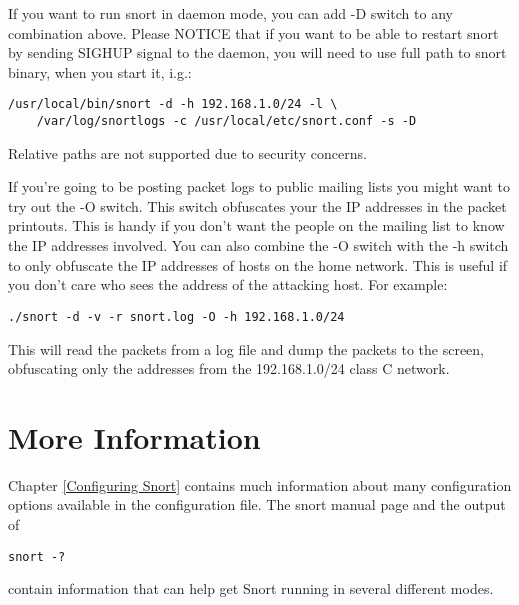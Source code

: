 \documentclass[english]{report}
\begin{document}
If you want to run snort in daemon mode, you can add -D switch to any
combination above. Please NOTICE that if you want to be able to restart snort
by sending SIGHUP signal to the daemon, you will need to use full path to snort
binary, when you start it, i.g.:

\begin{center}
\begin{verbatim}
/usr/local/bin/snort -d -h 192.168.1.0/24 -l \
    /var/log/snortlogs -c /usr/local/etc/snort.conf -s -D
\end{verbatim}
\end{center}

Relative paths are not supported due to security concerns.

If you're going to be posting packet logs to public mailing lists you might
want to try out the -O switch. This switch obfuscates your the IP addresses in
the packet printouts. This is handy if you don't want the people on the mailing
list to know the IP addresses involved. You can also combine the -O switch with
the -h switch to only obfuscate the IP addresses of hosts on the home network.
This is useful if you don't care who sees the address of the attacking host.
For example:

\begin{center}
\begin{verbatim}
./snort -d -v -r snort.log -O -h 192.168.1.0/24
\end{verbatim}
\end{center}

This will read the packets from a log file and dump the packets to the screen,
obfuscating only the addresses from the 192.168.1.0/24 class C network.

\section{More Information}

Chapter \ref{Configuring Snort} contains much information about many
configuration options available in the configuration file.  The snort manual
page and the output of 

\begin{center}
\begin{verbatim}
snort -? 
\end{verbatim}
\end{center}

contain information that can help get Snort running in several different modes.
\end{document}
